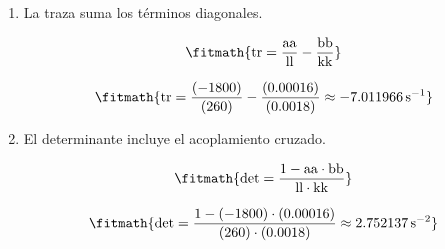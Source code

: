 \begin{enumerate}

\item La traza suma los términos diagonales.

\[\fitmath{\mathrm{tr}=\frac{\mathrm{aa}}{\mathrm{ll}}-\frac{\mathrm{bb}}{\mathrm{kk}}}\]

\[\fitmath{\mathrm{tr}=\frac{(-1800)}{(260)}-\frac{(0.00016)}{(0.0018)}\approx -7.011966\,\mathrm{s^{-1}}}\]

\item El determinante incluye el acoplamiento cruzado.

\[\fitmath{\mathrm{det}=\frac{1-\mathrm{aa}\cdot \mathrm{bb}}{\mathrm{ll}\cdot \mathrm{kk}}}\]

\[\fitmath{\mathrm{det}=\frac{1-(-1800)\cdot (0.00016)}{(260)\cdot (0.0018)}\approx 2.752137\,\mathrm{s^{-2}}}\]

\end{enumerate}
